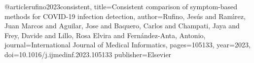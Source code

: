 @article{rufino2023consistent,
  title={Consistent comparison of symptom-based methods for COVID-19 infection detection},
  author={Rufino, Jes{\'u}s and Ram{\'\i}rez, Juan Marcos and Aguilar, Jose and Baquero, Carlos and Champati, Jaya and Frey, Davide and Lillo, Rosa Elvira and Fern{\'a}ndez-Anta, Antonio},
  journal={International Journal of Medical Informatics},
  pages={105133},
  year={2023},
  doi={10.1016/j.ijmedinf.2023.105133}
  publisher={Elsevier}
}


